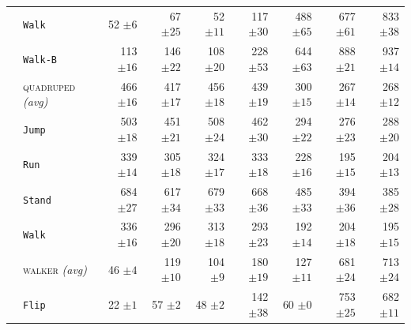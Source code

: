 \documentclass{article}
\theoremstyle{plain}
\theoremstyle{definition}
\theoremstyle{remark}
\newcommand{\domainavg}[1]{\textsc{#1} \textit{(avg)}}
\begin{document}
\begin{table}
\begin{tabular}{l l r r r r r r r}
& \hspace{.5em}\texttt{Walk} & 52 ${\scriptstyle \pm 6}$ & 67 ${\scriptstyle \pm 25}$ & 52 ${\scriptstyle \pm 11}$ & 117 ${\scriptstyle \pm 30}$ & 488 ${\scriptstyle \pm 65}$ & 677 ${\scriptstyle \pm 61}$ & 833 ${\scriptstyle \pm 38}$ \\
& \hspace{.5em}\texttt{Walk-B} & 113 ${\scriptstyle \pm 16}$ & 146 ${\scriptstyle \pm 22}$ & 108 ${\scriptstyle \pm 20}$ & 228 ${\scriptstyle \pm 53}$ & 644 ${\scriptstyle \pm 63}$ & 888 ${\scriptstyle \pm 21}$ & 937 ${\scriptstyle \pm 14}$ \\
\addlinespace
 \rowcolor{gray!15}  \cellcolor{white} & \domainavg{quadruped} & 466 ${\scriptstyle \pm 16}$ & 417 ${\scriptstyle \pm 17}$ & 456 ${\scriptstyle \pm 18}$ & 439 ${\scriptstyle \pm 19}$ & 300 ${\scriptstyle \pm 15}$ & 267 ${\scriptstyle \pm 14}$ & 268 ${\scriptstyle \pm 12}$ \\
& \hspace{.5em}\texttt{Jump} & 503 ${\scriptstyle \pm 18}$ & 451 ${\scriptstyle \pm 21}$ & 508 ${\scriptstyle \pm 24}$ & 462 ${\scriptstyle \pm 30}$ & 294 ${\scriptstyle \pm 22}$ & 276 ${\scriptstyle \pm 23}$ & 288 ${\scriptstyle \pm 20}$ \\
& \hspace{.5em}\texttt{Run} & 339 ${\scriptstyle \pm 14}$ & 305 ${\scriptstyle \pm 18}$ & 324 ${\scriptstyle \pm 17}$ & 333 ${\scriptstyle \pm 18}$ & 228 ${\scriptstyle \pm 16}$ & 195 ${\scriptstyle \pm 15}$ & 204 ${\scriptstyle \pm 13}$ \\
& \hspace{.5em}\texttt{Stand} & 684 ${\scriptstyle \pm 27}$ & 617 ${\scriptstyle \pm 34}$ & 679 ${\scriptstyle \pm 33}$ & 668 ${\scriptstyle \pm 36}$ & 485 ${\scriptstyle \pm 33}$ & 394 ${\scriptstyle \pm 36}$ & 385 ${\scriptstyle \pm 28}$ \\
& \hspace{.5em}\texttt{Walk} & 336 ${\scriptstyle \pm 16}$ & 296 ${\scriptstyle \pm 20}$ & 313 ${\scriptstyle \pm 18}$ & 293 ${\scriptstyle \pm 23}$ & 192 ${\scriptstyle \pm 14}$ & 204 ${\scriptstyle \pm 18}$ & 195 ${\scriptstyle \pm 15}$ \\
\addlinespace
  \rowcolor{gray!15}  \cellcolor{white} & \domainavg{walker} & 46 ${\scriptstyle \pm 4}$ & 119 ${\scriptstyle \pm 10}$ & 104 ${\scriptstyle \pm 9}$ & 180 ${\scriptstyle \pm 19}$ & 127 ${\scriptstyle \pm 11}$ & 681 ${\scriptstyle \pm 24}$ & 713 ${\scriptstyle \pm 24}$ \\
& \hspace{.5em}\texttt{Flip} & 22 ${\scriptstyle \pm 1}$ & 57 ${\scriptstyle \pm 2}$ & 48 ${\scriptstyle \pm 2}$ & 142 ${\scriptstyle \pm 38}$ & 60 ${\scriptstyle \pm 0}$ & 753 ${\scriptstyle \pm 25}$ & 682 ${\scriptstyle \pm 11}$ \\

\end{tabular}
\end{table}
\end{document}
